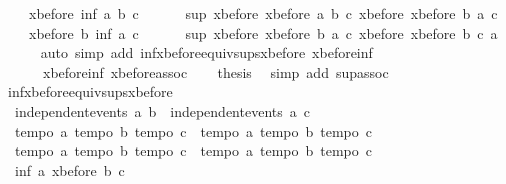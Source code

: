\begin{isabellebody}
\ \ \ \ {\isachardoublequoteopen}xbefore\ {\isacharparenleft}inf\ a\ b{\isacharparenright}\ c\ {\isacharequal}\ \isanewline
\ \ \ \ sup\ {\isacharparenleft}xbefore\ {\isacharparenleft}xbefore\ a\ b{\isacharparenright}\ c{\isacharparenright}\ {\isacharparenleft}xbefore\ {\isacharparenleft}xbefore\ b\ a{\isacharparenright}\ c{\isacharparenright}{\isachardoublequoteclose}\isanewline
\ \ \ \ {\isachardoublequoteopen}xbefore\ b\ {\isacharparenleft}inf\ a\ c{\isacharparenright}\ {\isacharequal}\ \isanewline
\ \ \ \ sup\ {\isacharparenleft}xbefore\ {\isacharparenleft}xbefore\ b\ a{\isacharparenright}\ c{\isacharparenright}\ {\isacharparenleft}xbefore\ {\isacharparenleft}xbefore\ b\ c{\isacharparenright}\ a{\isacharparenright}{\isachardoublequoteclose}\isanewline
\ \ \ \ \isamarkupfalse%
\ {\isacharparenleft}auto\ simp\ add{\isacharcolon}\ inf{\isacharunderscore}xbefore{\isacharunderscore}equiv{\isacharunderscore}sups{\isacharunderscore}xbefore\ xbefore{\isacharunderscore}inf{\isacharunderscore}{}\ \isanewline
\ \ \ \ \ \ xbefore{\isacharunderscore}inf{\isacharunderscore}{}\ xbefore{\isacharunderscore}assoc{\isacharparenright}\isanewline
\ \ \isamarkupfalse%
\ {\isacharquery}thesis\ \isamarkupfalse%
\ {\isacharparenleft}simp\ add{\isacharcolon}\ sup{\isachardot}assoc{\isacharparenright}\isanewline
{}\isamarkupfalse%
%
\endisatagproof
{\isafoldproof}%
%
\isadelimproof
\isanewline
%
\endisadelimproof
\isanewline
{}\isamarkupfalse%
\ inf{\isacharunderscore}xbefore{\isacharunderscore}equiv{\isacharunderscore}sups{\isacharunderscore}xbefore{\isacharunderscore}{}{\isacharcolon}\isanewline
\ \ {\isachardoublequoteopen}independent{\isacharunderscore}events\ a\ b\ {\isasymLongrightarrow}\ independent{\isacharunderscore}events\ a\ c\ \ {\isasymLongrightarrow}\ \isanewline
\ \ {\isasymlbrakk}tempo{}\ a{\isacharsemicolon}\ tempo{}\ b{\isacharsemicolon}\ tempo{}\ c{\isasymrbrakk}\ {\isasymLongrightarrow}\ {\isasymlbrakk}tempo{}\ a{\isacharsemicolon}\ tempo{}\ b{\isacharsemicolon}\ tempo{}\ c{\isasymrbrakk}\ {\isasymLongrightarrow}\ \isanewline
\ \ {\isasymlbrakk}tempo{}\ a{\isacharsemicolon}\ tempo{}\ b{\isacharsemicolon}\ tempo{}\ c{\isasymrbrakk}\ {\isasymLongrightarrow}\ {\isasymlbrakk}tempo{}\ a{\isacharsemicolon}\ tempo{}\ b{\isacharsemicolon}\ tempo{}\ c{\isasymrbrakk}\ {\isasymLongrightarrow}\isanewline
\ \ inf\ a\ {\isacharparenleft}xbefore\ b\ c{\isacharparenright}\ {\isacharequal}\ \isanewline

\end{isabellebody}
